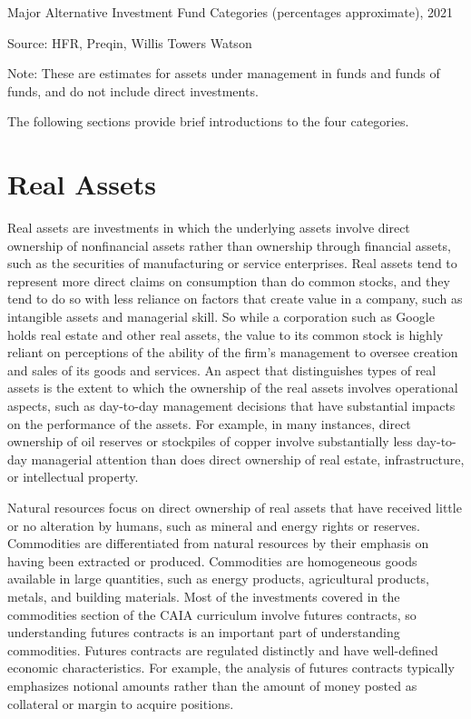 \documentclass[11pt]{article}
\begin{document}
Major Alternative Investment Fund Categories (percentages approximate), 2021

Source: HFR, Preqin, Willis Towers Watson

Note: These are estimates for assets under management in funds and funds of funds, and do not include direct investments.

The following sections provide brief introductions to the four categories.

\section*{Real Assets}
Real assets are investments in which the underlying assets involve direct ownership of nonfinancial assets rather than ownership through financial assets, such as the securities of manufacturing or service enterprises. Real assets tend to represent more direct claims on consumption than do common stocks, and they tend to do so with less reliance on factors that create value in a company, such as intangible assets and managerial skill. So while a corporation such as Google holds real estate and other real assets, the value to its common stock is highly reliant on perceptions of the ability of the firm's management to oversee creation and sales of its goods and services. An aspect that distinguishes types of real assets is the extent to which the ownership of the real assets involves operational aspects, such as day-to-day management decisions that have substantial impacts on the performance of the assets. For example, in many instances, direct ownership of oil reserves or stockpiles of copper involve substantially less day-to-day managerial attention than does direct ownership of real estate, infrastructure, or intellectual property.

Natural resources focus on direct ownership of real assets that have received little or no alteration by humans, such as mineral and energy rights or reserves. Commodities are differentiated from natural resources by their emphasis on having been extracted or produced. Commodities are homogeneous goods available in large quantities, such as energy products, agricultural products, metals, and building materials. Most of the investments covered in the commodities section of the CAIA curriculum involve futures contracts, so understanding futures contracts is an important part of understanding commodities. Futures contracts are regulated distinctly and have well-defined economic characteristics. For example, the analysis of futures contracts typically emphasizes notional amounts rather than the amount of money posted as collateral or margin to acquire positions.
\end{document}
